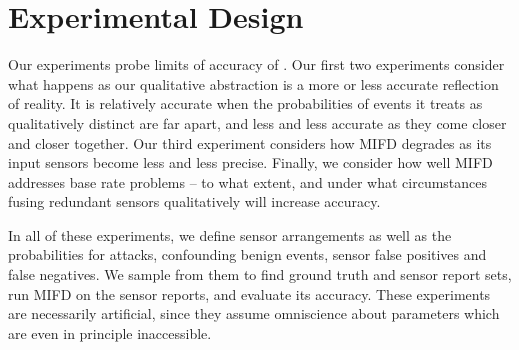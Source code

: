 \section{Experimental Design}
\label{sec:experimental-design}

Our experiments probe limits of accuracy of \zplus.
Our first two experiments consider what happens as our qualitative abstraction
is a more or less accurate reflection of reality.  It is relatively accurate when the
probabilities of events it treats as qualitatively distinct are far apart, and
less and less accurate as they come closer and closer together. 
Our third experiment considers how MIFD degrades as its input sensors become
less and less precise.
Finally, we consider how well MIFD addresses base rate problems -- to what
extent, and under what circumstances fusing redundant sensors qualitatively will
increase accuracy.

In all of these experiments, we define sensor arrangements as well as the probabilities for attacks, confounding
benign events, sensor false positives and false negatives. We sample from
them to find ground truth and sensor report sets, run MIFD on the sensor
reports, and evaluate its accuracy.
These experiments are necessarily artificial, since they assume
omniscience about parameters which are even in principle inaccessible.


